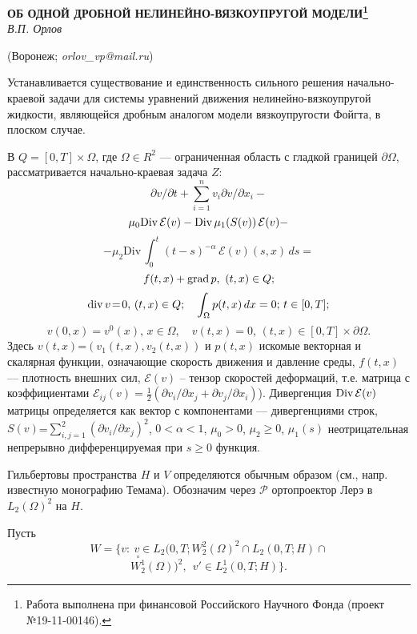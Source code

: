 \begin{center}
    {\bf ОБ ОДНОЙ  ДРОБНОЙ НЕЛИНЕЙНО-ВЯЗКОУПРУГОЙ МОДЕЛИ\footnote{Работа  выполнена при финансовой  Российского Научного Фонда (проект №19-11-00146).}}\\

    {\it В.П. Орлов}

    (Воронеж; {\it orlov{\_}vp@mail.ru})
\end{center}


Устанавливается существование и единственность сильного решения на\-чаль\-но-краевой задачи для системы уравнений движения нелинейно-вяз\-ко\-упругой жидкости, являющейся дробным аналогом модели вязкоупругости Фойгта, в плоском случае.

В $Q=[0,T] \times \Omega$, где $ \Omega\in R^2$ --- ограниченная область с гладкой границей $\partial \Omega$, рассматривается началь\-но-крае\-вая за\-да\-ча $Z$:
$$
\partial v/\partial t + {\sum_{i=1}^n } v_i \partial v /\partial x_i  -
$$
$$
 \mu_0 {\rm Div}\,\mathcal{E}(v) -{\rm Div}\,\mu_1(S(v))\,\mathcal{E}(v)-
$$
$$
-\mu_2\mathrm{Div}\,\int_{0}^t(t-s)^{-\alpha}\,\mathcal{E}(v)(s, x)\,ds =
$$
$$
f(t,x)+{\rm grad} \, p,\ (t,x)  \in  Q;
$$
$$
{\rm div}\,v \!=\!0,\, (t,x) \in Q; \quad \int_{\Omega} p(t,x)\, dx=0;\, t\in [0,T];
$$
$$
 v(0,x) = v^0 (x), \,  x\in \Omega,\quad   v(t,x)=0,\, (t,x)\in [0,T]\times \partial\Omega.
$$
Здесь $v(t,x)$=$ (v_1(t,x),v_2(t,x))$ и $p(t,x)$  искомые векто\-рная и скалярная
функции, означающие  скорость движе\-ния и давление среды, $f(t,x)$ ---
плотность внешних сил, $\mathcal{E}(v)$ -- тензор
скоростей деформаций, т.е. матрица с коэффициентами $\mathcal{E}_{ij}(v)\! =\! \frac 1
2 (\partial v_i/\partial x_j +\partial v_j/\partial x_i )$).
Дивергенция  ${\rm Div}\, \mathcal{E}(v)$ матрицы определяется как вектор с
компонентами --- дивергенциями строк, $S(v)$=$\sum_{i,j=1}^{2} (
\partial v_i/\partial x_j)^2$, $0<\alpha<1$, $\mu_0>0$, $\mu_2\ge 0$, $\mu_1(s)$ неотрицательная непрерывно
дифференцируемая при $s\ge 0$ функция.


 Гильбертовы пространства  $H$ и $V$ определяются обычным образом
 (см., напр. известную монографию Темама).
Обозначим через $\mathcal{P}$ ортопроектор Лерэ в $L_2(\Omega)^2$ на $H$.

Пусть
$$
W\!=\{v:\ v\in L_2(0,T;W_2^2(\Omega)^2\cap L_2(0,T; H) \cap $$$$\stackrel{\circ}{W_2^1}(\Omega))^2,\ \ v'\in L_2^1(0,T;H)\}.
$$

